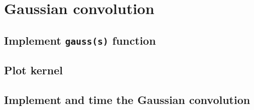 \documentclass[abstract=true]{scrartcl}
\begin{document}


\section{Gaussian convolution}

    \subsection{Implement \texttt{gauss(s)} function}

    \subsection{Plot kernel}


    \subsection{Implement and time the Gaussian convolution}

        
\end{document}
